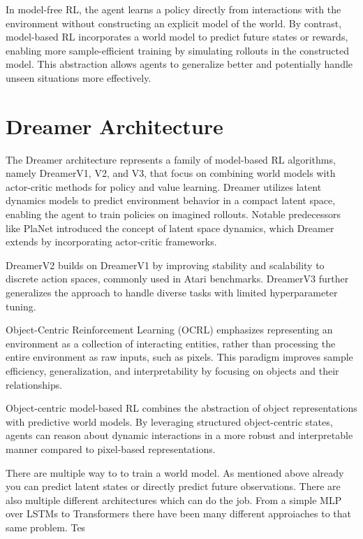 \documentclass[
	english,
	ruledheaders=section,
	class=report,
	thesis={type=master},
	accentcolor=9c,
	custommargins=true,
	marginpar=false,
	parskip=half-,
	fontsize=11pt,
]{tudapub}
\begin{document}
In model-free RL, the agent learns a policy directly from interactions with the
environment without constructing an explicit model of the world. By contrast,
model-based RL incorporates a world model to predict future states or rewards,
enabling more sample-efficient training by simulating rollouts in the
constructed model. This abstraction allows agents to generalize better and
potentially handle unseen situations more effectively.

\section{Dreamer Architecture}
\label{sec:dreamer_architecture}

The Dreamer architecture represents a family of model-based RL algorithms,
namely DreamerV1, V2, and V3, that focus on combining world models with
actor-critic methods for policy and value learning. Dreamer utilizes latent
dynamics models to predict environment behavior in a compact latent space,
enabling the agent to train policies on imagined rollouts. Notable predecessors
like PlaNet introduced the concept of latent space dynamics, which Dreamer
extends by incorporating actor-critic frameworks.

DreamerV2 builds on DreamerV1 by improving stability and scalability to
discrete action spaces, commonly used in Atari benchmarks. DreamerV3 further
generalizes the approach to handle diverse tasks with limited hyperparameter
tuning.

Object-Centric Reinforcement Learning (OCRL) emphasizes representing an
environment as a collection of interacting entities, rather than processing the
entire environment as raw inputs, such as pixels. This paradigm improves sample
efficiency, generalization, and interpretability by focusing on objects and
their relationships.

Object-centric model-based RL combines the abstraction of object
representations with predictive world models. By leveraging structured
object-centric states, agents can reason about dynamic interactions in a more
robust and interpretable manner compared to pixel-based representations.

There are multiple way to to train a world model. As mentioned above already
you can predict latent states or directly predict future observations. There
are also multiple different architectures which can do the job. From a simple
MLP over LSTMs to Transformers there have been many different approiaches to
that same problem. Tes
\end{document}
